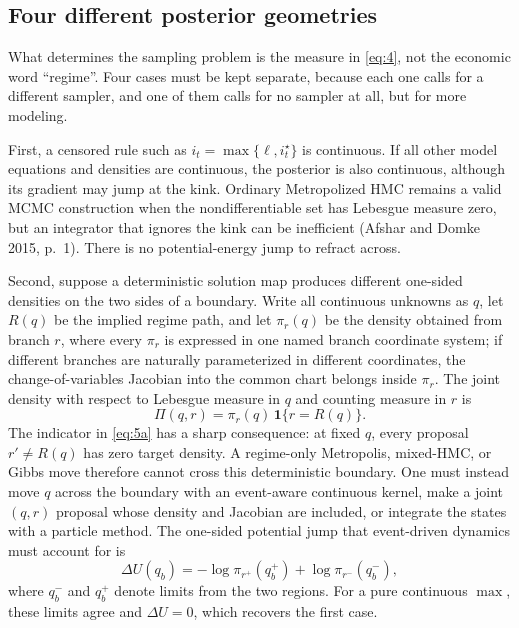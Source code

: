 \documentclass[11pt]{article}
\begin{document}
\subsection{Four different posterior geometries}\label{sec:geometries}

What determines the sampling problem is the measure in \eqref{eq:4}, not the
economic word ``regime''. Four cases must be kept separate, because each one
calls for a different sampler, and one of them calls for no sampler at
all, but for more modeling.

First, a censored rule such as \(i_t=\max\{\ell,i_t^\star\}\) is continuous.
If all other model equations and densities are continuous, the posterior is
also continuous, although its gradient may jump at the kink. Ordinary
Metropolized HMC remains a valid MCMC construction when the
nondifferentiable set has Lebesgue measure zero, but an integrator that
ignores the kink can be inefficient (Afshar and Domke 2015, p.~1). There is
no potential-energy jump to refract across.

Second, suppose a deterministic solution map produces different one-sided
densities on the two sides of a boundary. Write all continuous unknowns as
\(q\), let \(R(q)\) be the implied regime path, and let \(\pi_r(q)\) be the
density obtained from branch \(r\), where every \(\pi_r\) is expressed in one
named branch coordinate system; if different branches are naturally
parameterized in different coordinates, the change-of-variables Jacobian
into the common chart belongs inside \(\pi_r\). The joint density with
respect to Lebesgue measure in \(q\) and counting measure in \(r\) is
\begin{equation}\label{eq:5a}
 \Pi(q,r)=\pi_r(q)\,\mathbf 1\{r=R(q)\}.
\end{equation}
The indicator in \eqref{eq:5a} has a sharp consequence: at fixed \(q\), every
proposal \(r'\ne R(q)\) has zero target density. A regime-only Metropolis,
mixed-HMC, or Gibbs move therefore cannot cross this deterministic boundary.
One must instead move \(q\) across the boundary with an event-aware
continuous kernel, make a joint \((q,r)\) proposal whose density and Jacobian
are included, or integrate the states with a particle method. The one-sided
potential jump that event-driven dynamics must account for is
\begin{equation}\label{eq:5b}
 \Delta U(q_b)=-\log \pi_{r^+}(q_b^+)+\log \pi_{r^-}(q_b^-),
\end{equation}
where \(q_b^-\) and \(q_b^+\) denote limits from the two regions. For a pure
continuous \(\max\), these limits agree and \(\Delta U=0\), which recovers
the first case.
\end{document}
